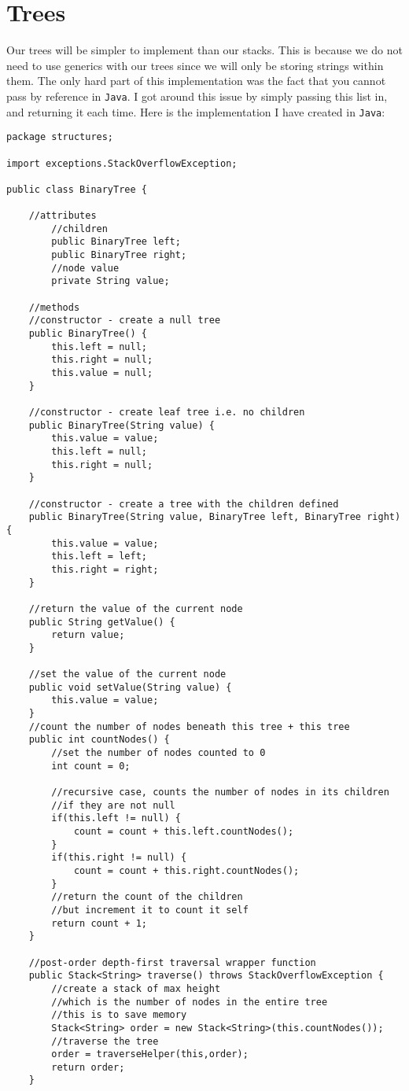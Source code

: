 \documentclass[../../../../main.tex]{subfiles}
\begin{document}
\section{Trees}
Our trees will be simpler to implement than our stacks. This is because we do not need to use generics with our trees since we will only be storing strings within them. The only hard part of this implementation was the fact that you cannot pass by reference\cite{byRefJava} in \texttt{Java}. I got around this issue by simply passing this list in, and returning it each time. Here is the implementation I have created in \texttt{Java}:
\begin{verbatim}
package structures;

import exceptions.StackOverflowException;

public class BinaryTree {
	
	//attributes
		//children
		public BinaryTree left;
		public BinaryTree right;
		//node value
		private String value;
	
	//methods
	//constructor - create a null tree
	public BinaryTree() {
		this.left = null;
		this.right = null;
		this.value = null;
	}
	
	//constructor - create leaf tree i.e. no children
	public BinaryTree(String value) {
		this.value = value;
		this.left = null;
		this.right = null;
	}
	
	//constructor - create a tree with the children defined
	public BinaryTree(String value, BinaryTree left, BinaryTree right) {
		this.value = value;
		this.left = left;
		this.right = right;
	}
	
	//return the value of the current node
	public String getValue() {
		return value;
	}

	//set the value of the current node
	public void setValue(String value) {
		this.value = value;
	}
	//count the number of nodes beneath this tree + this tree
	public int countNodes() {
		//set the number of nodes counted to 0
		int count = 0;
		
		//recursive case, counts the number of nodes in its children
		//if they are not null
		if(this.left != null) {
			count = count + this.left.countNodes();
		}
		if(this.right != null) {
			count = count + this.right.countNodes();
		}
		//return the count of the children
		//but increment it to count it self
		return count + 1;
	}
	
	//post-order depth-first traversal wrapper function
	public Stack<String> traverse() throws StackOverflowException {
		//create a stack of max height
		//which is the number of nodes in the entire tree
		//this is to save memory
		Stack<String> order = new Stack<String>(this.countNodes());
		//traverse the tree
		order = traverseHelper(this,order);
		return order;
	}
	

\end{verbatim}
\end{document}
